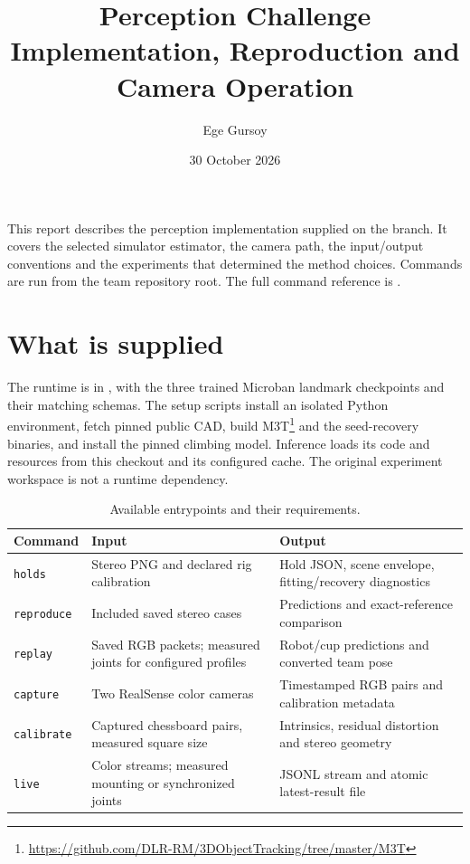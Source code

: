 \documentclass[11pt,a4paper]{article}
\title{Perception Challenge\\\large Implementation, Reproduction and Camera Operation}
\author{Ege Gursoy}
\date{30 October 2026}
\begin{document}
\maketitle
This report describes the perception implementation supplied on the
 branch. It covers the selected simulator
estimator, the camera path, the input/output conventions and the experiments
that determined the method choices. Commands are run from the team repository
root. The full command reference is .

\section{What is supplied}
The runtime is in , with the three trained
Microban landmark checkpoints and their matching schemas. The setup scripts
install an isolated Python environment, fetch pinned public CAD, build M3T\footnote{\url{https://github.com/DLR-RM/3DObjectTracking/tree/master/M3T}} and
the seed-recovery binaries, and install the pinned climbing model. Inference
loads its code and resources from this checkout and its configured cache. The
original experiment workspace is not a runtime dependency.

\begin{table}[htbp]\centering
\caption{Available entrypoints and their requirements.}
\begin{tabularx}{\linewidth}{@{}lYY@{}}\toprule
Command & Input & Output\\\midrule
\texttt{holds} & Stereo PNG and declared rig calibration & Hold JSON, scene envelope, fitting/recovery diagnostics\\
\texttt{reproduce} & Included saved stereo cases & Predictions and exact-reference comparison\\
\texttt{replay} & Saved RGB packets; measured joints for configured profiles & Robot/cup predictions and converted team pose\\
\texttt{capture} & Two RealSense color cameras & Timestamped RGB pairs and calibration metadata\\
\texttt{calibrate} & Captured chessboard pairs, measured square size & Intrinsics, residual distortion and stereo geometry\\
\texttt{live} & Color streams; measured mounting or synchronized joints & JSONL stream and atomic latest-result file\\\bottomrule
\end{tabularx}
\end{table}
\end{document}

